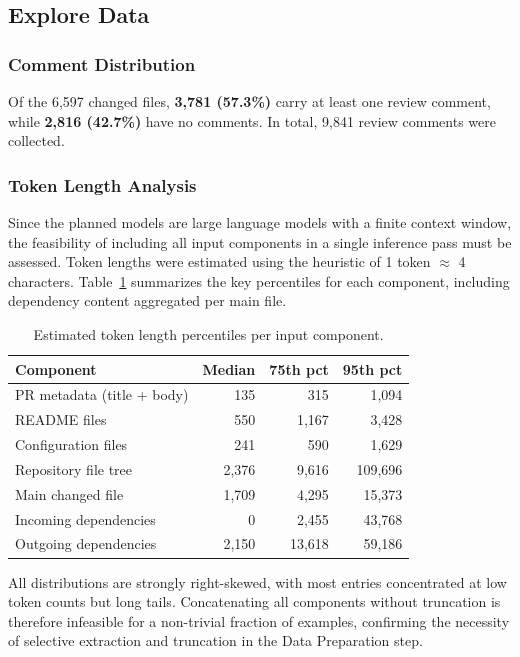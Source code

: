 \documentclass[11pt]{article}
\begin{document}
\subsection*{Explore Data}

\subsubsection*{Comment Distribution}

Of the 6,597 changed files, \textbf{3,781 (57.3\%)} carry at least one review comment, while \textbf{2,816 (42.7\%)} have no comments. In total, 9,841 review comments were collected.

\subsubsection*{Token Length Analysis}

Since the planned models are large language models with a finite context window, the feasibility of including all input components in a single inference pass must be assessed. Token lengths were estimated using the heuristic of 1 token $\approx$ 4 characters. Table~\ref{tab:token_lengths} summarizes the key percentiles for each component, including dependency content aggregated per main file.

\begin{table}[H]
\centering
\caption{Estimated token length percentiles per input component.}
\label{tab:token_lengths}
\begin{tabular}{@{}lrrr@{}}
\toprule
\textbf{Component} & \textbf{Median} & \textbf{75th pct} & \textbf{95th pct} \\ \midrule
PR metadata (title + body) & 135 & 315 & 1,094 \\
README files & 550 & 1,167 & 3,428 \\
Configuration files & 241 & 590 & 1,629 \\
Repository file tree & 2,376 & 9,616 & 109,696 \\
Main changed file & 1,709 & 4,295 & 15,373 \\
Incoming dependencies & 0 & 2,455 & 43,768 \\
Outgoing dependencies & 2,150 & 13,618 & 59,186 \\ \bottomrule
\end{tabular}
\end{table}

All distributions are strongly right-skewed, with most entries concentrated at low token counts but long tails. Concatenating all components without truncation is therefore infeasible for a non-trivial fraction of examples, confirming the necessity of selective extraction and truncation in the Data Preparation step.
\end{document}
